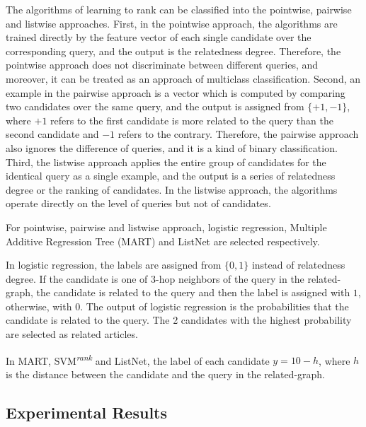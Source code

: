The algorithms of learning to rank can be classified into the pointwise, pairwise and listwise approaches. First, in the pointwise approach, the algorithms are trained directly by the feature vector of each single candidate over the corresponding query, and the output is the relatedness degree. Therefore, the pointwise approach does not discriminate between different queries, and moreover, it can be treated as an approach of multiclass classification. Second, an example in the pairwise approach is a vector which is computed by comparing two candidates over the same query, and the output is assigned from $\{+1, -1\}$, where $+1$ refers to the first candidate is more related to the query than the second candidate and $-1$ refers to the contrary. Therefore, the pairwise approach also ignores the difference of queries, and it is a kind of binary classification. Third, the listwise approach applies the entire group of candidates for the identical query as a single example, and the output is a series of relatedness degree or the ranking of candidates. In the listwise approach, the algorithms operate directly on the level of queries but not of candidates. 

For pointwise, pairwise and listwise approach, logistic regression, Multiple Additive Regression Tree (MART) \citep{friedman2002stochastic} and ListNet \citep{cao2007learning} are selected respectively. 

In logistic regression, the labels are assigned from $\{0, 1\}$ instead of relatedness degree. If the candidate is one of $3$-hop neighbors of the query in the related-graph, the candidate is related to the query and then the label is assigned with $1$, otherwise, with $0$. The output of logistic regression is the probabilities that the candidate is related to the query. The 2 candidates with the highest probability are selected as related articles. 

In MART, SVM\textsuperscript{\textit{rank}} and ListNet, the label of each candidate $y = 10 - h$, where $h$ is the distance between the candidate and the query in the related-graph. 



\subsection{Experimental Results}
\label{sec:6.4}

